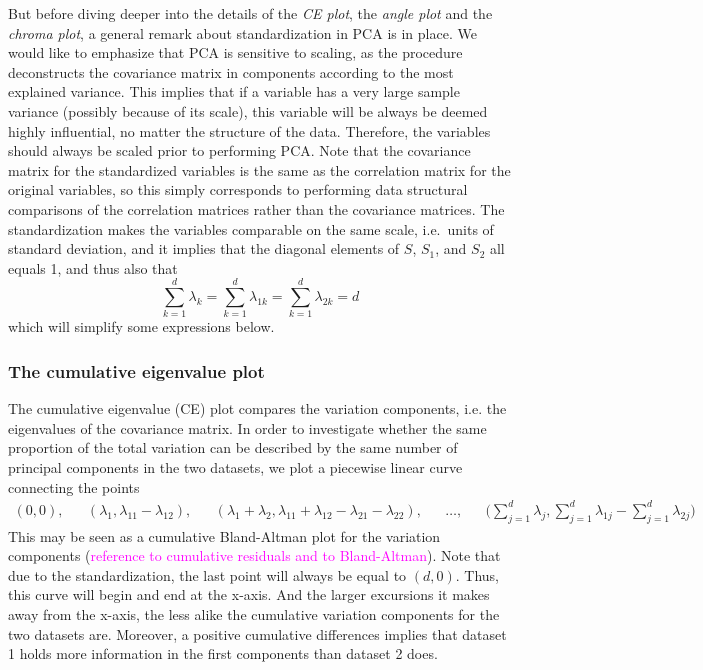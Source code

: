 \documentclass[titlepage,11pt,twoside]{article}
\newcommand{\hl}[1]{\textcolor{magenta}{#1}}
\begin{document}
But before diving deeper into the details of the \emph{CE plot}, the \emph{angle plot} and the \emph{chroma plot}, a general remark about standardization in PCA is in place. We would like to emphasize that PCA is sensitive to scaling, as the procedure deconstructs the covariance matrix in components according to the most explained variance. This implies that if a variable has a very large sample variance (possibly because of its scale), this variable will be always be deemed highly influential, no matter the structure of the data. Therefore, the variables should always be scaled prior to performing PCA. Note that the covariance matrix for the standardized variables is the same as the correlation matrix for the original variables, so this simply corresponds to performing data structural comparisons of the correlation matrices rather than the covariance matrices. The standardization makes the variables comparable on the same scale, i.e.\ units of standard deviation, and it implies that the diagonal elements of $S$, $S_1$, and $S_2$ all equals 1, and thus also that
$$\sum_{k=1}^d \lambda_k = \sum_{k=1}^d \lambda_{1k} = \sum_{k=1}^d \lambda_{2k} =  d$$
which will simplify some expressions below.

\subsubsection{The cumulative eigenvalue plot}
 The cumulative eigenvalue (CE) plot compares the variation components, i.e. the eigenvalues of the covariance matrix.
In order to investigate whether the same proportion of the total variation can be described by the same number of principal components in the two datasets, we plot a piecewise linear curve connecting the points
\begin{align*}
(0,0), &&
(\lambda_1,\lambda_{11}-\lambda_{12}), &&
(\lambda_1 + \lambda_2,\lambda_{11}+\lambda_{12}-\lambda_{21}-\lambda_{22}), &&
\ldots, &&
\bigg( \sum_{j=1}^d \lambda_j, \sum_{j=1}^d \lambda_{1j} - \sum_{j=1}^d \lambda_{2j} \bigg)
\end{align*}
This may be seen as a cumulative Bland-Altman plot for the variation components (\hl{reference to cumulative residuals and to Bland-Altman}). Note that due to the standardization, the last point will always be equal to $(d,0)$. Thus, this curve will begin and end at the x-axis. And the larger excursions it makes away from the x-axis, the less alike the cumulative variation components for the two datasets are. Moreover, a positive cumulative differences implies that dataset 1 holds more information in the first components than dataset 2 does.
\end{document}
